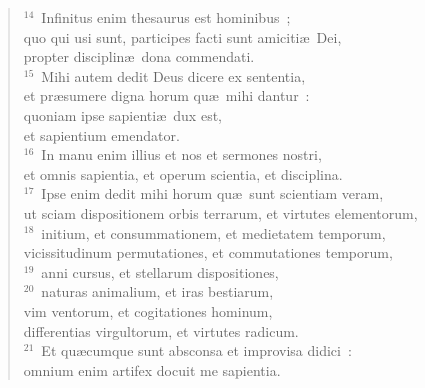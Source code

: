 \begin{verse}
${}^{14}$~Infinitus enim thesaurus est hominibus~;\\ quo qui usi sunt, participes facti sunt amiciti\ae\ Dei,\\ propter disciplin\ae\ dona commendati.\\
${}^{15}$~Mihi autem dedit Deus dicere ex sententia,\\ et pr\ae sumere digna horum qu\ae\ mihi dantur~:\\ quoniam ipse sapienti\ae\ dux est,\\ et sapientium emendator.\\
${}^{16}$~In manu enim illius et nos et sermones nostri,\\ et omnis sapientia, et operum scientia, et disciplina.\\
${}^{17}$~Ipse enim dedit mihi horum qu\ae\ sunt scientiam veram,\\ ut sciam dispositionem orbis terrarum, et virtutes elementorum,\\
${}^{18}$~initium, et consummationem, et medietatem temporum,\\ vicissitudinum permutationes, et commutationes temporum,\\
${}^{19}$~anni cursus, et stellarum dispositiones,\\
${}^{20}$~naturas animalium, et iras bestiarum,\\ vim ventorum, et cogitationes hominum,\\ differentias virgultorum, et virtutes radicum.\\
${}^{21}$~Et qu\ae cumque sunt absconsa et improvisa didici~:\\ omnium enim artifex docuit me sapientia.\end{verse}


